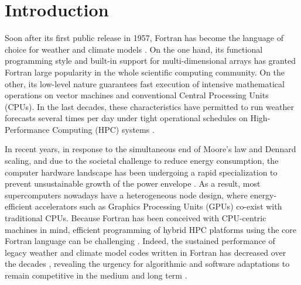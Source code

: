 \documentclass[../main.tex]{subfiles}
\begin{document}
	\justifying

	\section{Introduction}
    \label{section:introduction}

    Soon after its first public release in 1957, Fortran has become the language of choice for weather and climate models \citep{mendez14}. On the one hand, its functional programming style and built-in support for multi-dimensional arrays has granted Fortran large popularity in the whole scientific computing community. On the other, its low-level nature guarantees fast execution of intensive mathematical operations on vector machines and conventional Central Processing Units (CPUs). In the last decades, these characteristics have permitted to run weather forecasts several times per day under tight operational schedules on High-Performance Computing (HPC) systems \citep{neumann19}.

    In recent years, in response to the simultaneous end of Moore's law and Dennard scaling, and due to the societal challenge to reduce energy consumption, the computer hardware landscape has been undergoing a rapid specialization to prevent unsustainable growth of the power envelope \citep{muller19}. As a result, most supercomputers nowadays have a heterogeneous node design, where energy-efficient accelerators such as Graphics Processing Units (GPUs) co-exist with traditional CPUs. Because Fortran has been conceived with CPU-centric machines in mind, efficient programming of hybrid HPC platforms using the core Fortran language can be challenging \citep{mendez14, lawrence18}. Indeed, the sustained performance of legacy weather and climate model codes written in Fortran has decreased over the decades \citep{schulthess18}, revealing the urgency for algorithmic and software adaptations to remain competitive in the medium and long term \citep{bauer21}.
\end{document}
